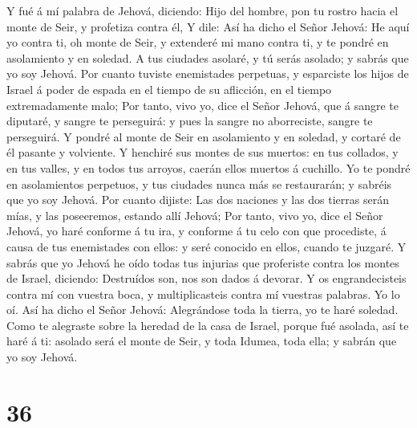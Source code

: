  Y fué á mí palabra de Jehová, diciendo:  Hijo
del hombre, pon tu rostro hacia el monte de Seir, y profetiza contra él,
 Y dile: Así ha dicho el Señor Jehová: He aquí yo contra ti,
oh monte de Seir, y extenderé mi mano contra ti, y te pondré en
asolamiento y en soledad.  A tus ciudades asolaré, y tú
serás asolado; y sabrás que yo soy Jehová.  Por cuanto
tuviste enemistades perpetuas, y esparciste los hijos de Israel á poder
de espada en el tiempo de su aflicción, en el tiempo extremadamente
malo;  Por tanto, vivo yo, dice el Señor Jehová, que á
sangre te diputaré, y sangre te perseguirá: y pues la sangre no
aborreciste, sangre te perseguirá.  Y pondré al monte de
Seir en asolamiento y en soledad, y cortaré de él pasante y volviente.
 Y henchiré sus montes de sus muertos: en tus collados, y en
tus valles, y en todos tus arroyos, caerán ellos muertos á cuchillo.
 Yo te pondré en asolamientos perpetuos, y tus ciudades
nunca más se restaurarán; y sabréis que yo soy Jehová.  Por
cuanto dijiste: Las dos naciones y las dos tierras serán mías, y las
poseeremos, estando allí Jehová;  Por tanto, vivo yo, dice
el Señor Jehová, yo haré conforme á tu ira, y conforme á tu celo con que
procediste, á causa de tus enemistades con ellos: y seré conocido en
ellos, cuando te juzgaré.  Y sabrás que yo Jehová he oído
todas tus injurias que proferiste contra los montes de Israel, diciendo:
Destruídos son, nos son dados á devorar.  Y os
engrandecisteis contra mí con vuestra boca, y multiplicasteis contra mí
vuestras palabras. Yo lo oí.  Así ha dicho el Señor Jehová:
Alegrándose toda la tierra, yo te haré soledad.  Como te
alegraste sobre la heredad de la casa de Israel, porque fué asolada, así
te haré á ti: asolado será el monte de Seir, y toda Idumea, toda ella; y
sabrán que yo soy Jehová.

\hypertarget{section-35}{%
\section{36}\label{section-35}}


